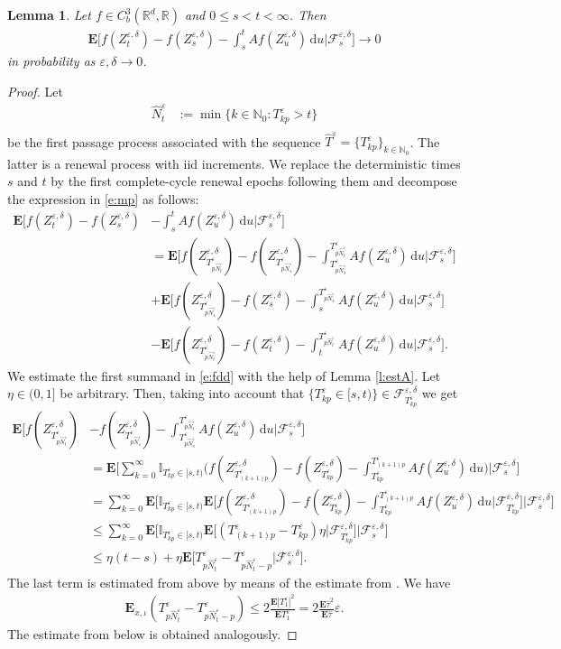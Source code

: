 \documentclass[10pt]{article}
\newcommand{\E}{\mathbf{E}}
\newcommand{\1}{1\!\!\!\;{\rm I}}
\theoremstyle{plain}
\newtheorem{lem}[thm]{Lemma}
\theoremstyle{definition}
\newcommand{\e}{\varepsilon}
\newcommand{\ba}{\begin{equation}\begin{aligned}}
\newcommand{\ea}{\end{aligned}\end{equation}}
\newcommand{\di}{\mathrm{d}}
\newcommand{\rF}{\mathscr{F}}
\newcommand{\bI}{\mathbb{I}}
\newcommand{\bR}{\mathbb{R}}
\numberwithin{equation}{section}
\begin{document}
\begin{lem}
\label{l:mp}
Let $f\in C^3_b(\bR^d,\bR)$ and $0\leq s<t<\infty$. Then
\ba
\label{e:mp}
\E\Big[ f(Z^{\e,\delta}_{t}) - f( Z^{\e,\delta}_s  ) - \int_s^t Af(Z^{\e,\delta}_u)\,\di u\Big|\rF^{\e,\delta}_s\Big]
\to 0
\ea
in probability as $\e,\delta\to 0$.
\end{lem}
\begin{proof}
Let
\ba
\widehat N^\e_t&:=\min\{k\in\mathbb N_0 \colon T^\e_{kp}> t\}\\
\ea
be the first passage process associated with the sequence $\widehat T^\e=\{T^\e_{kp}\}_{k\in\mathbb N_0}$.
The latter is a renewal process with iid increments. We replace the deterministic times $s$ and $t$
by the first complete-cycle renewal epochs following them and decompose the expression in
\eqref{e:mp}
as follows:
\ba
\label{e:fdd}
\E\Big[f(Z^{\e,\delta}_t) - f(Z^{\e,\delta}_s) & - \int_s^t Af(Z^{\e,\delta}_u)\,\di u\Big|\rF_s^{\e,\delta}\Big]\\
&=\E\Big[f(Z^{\e,\delta}_{T^\e_{p \widehat N^\e_t}}) - f(Z^{\e,\delta}_{T^\e_{p \widehat N^\e_s}})
- \int^{T^\e_{p \widehat N^\e_t}}_{T^\e_{p \widehat N^\e_s}}  Af(Z^{\e,\delta}_u)\,\di u\Big|\rF_s^{\e,\delta}\Big]\\
&+ \E\Big[f(Z^{\e,\delta}_{T^\e_{p \widehat N^\e_s}}) - f(Z^{\e,\delta}_{s})
- \int_{s}^{T^\e_{p \widehat N^\e_s}} Af(Z^{\e,\delta}_u)\,\di u\Big|\rF_s^{\e,\delta}\Big]\\
&-\E\Big[ f(Z^{\e,\delta}_{T^\e_{p \widehat N^\e_t}}) - f(Z^{\e,\delta}_t)
-\int_{t}^{T^\e_{p \widehat N^\e_t}} Af(Z^{\e,\delta}_u)\,\di u\Big|\rF_s^{\e,\delta}\Big].
\ea
We estimate the first summand in \eqref{e:fdd} with the help of Lemma \ref{l:estA}. Let $\eta\in(0,1]$ be arbitrary. Then,
taking into account that $\{T^\e_{kp}\in[s,t)\} \in \rF^{\e,\delta}_{T^\e_{kp}}$ we get
\ba
\E\Big[f(Z^{\e,\delta}_{T^\e_{p \widehat N^\e_t}}) & - f(Z^{\e,\delta}_{T^\e_{p \widehat N^\e_s}})
- \int^{T^\e_{p \widehat N^\e_t}}_{T^\e_{p \widehat N^\e_s}}  Af(Z^{\e,\delta}_u)\,\di u\Big|\rF_s^{\e,\delta}\Big]\\
&=\E\Big[\sum_{k=0}^\infty\bI_{T^\e_{kp}\in[s,t)} \Big(f(Z^{\e,\delta}_{T^\e_{(k+1)p}})
- f(Z^{\e,\delta}_{T^\e_{kp}})
- \int^{T^\e_{(k+1)p}}_{T^\e_{kp}} Af(Z^{\e,\delta}_u)\,\di u\Big)\Big|\rF_s^{\e,\delta}\Big]\\
&=\sum_{k=0}^\infty\E \Big[\bI_{T^\e_{kp}\in[s,t)} \E\Big[f(Z^{\e,\delta}_{T^\e_{(k+1)p}}) - f(Z^{\e,\delta}_{T^\e_{kp}})
- \int_{T^\e_{kp}}^{T^\e_{(k+1)p}} Af(Z^{\e,\delta}_u)\,\di u\Big|\rF^{\e,\delta}_{T^\e_{kp}} \Big]  \Big|\rF_s^{\e,\delta}\Big]\\
&\leq\sum_{k=0}^\infty
\E \Big[\bI_{T^\e_{kp}\in[s,t)}
\E\Big[ (T^\e_{(k+1)p}-T^\e_{kp})\eta \Big|\rF^{\e,\delta}_{T^\e_{kp}} \Big]  \Big|\rF_s^{\e,\delta}\Big]\\
&\leq \eta (t-s)
+ \eta \E\Big[T^\e_{p \widehat N^\e_t}-T^\e_{p \widehat N^\e_t-p} \Big|\rF_s^{\e,\delta}\Big].
\ea
The last term is estimated from above by means of
the estimate from \cite[Section 2]{lorden1970excess}. We have
\ba
\E_{x,\iota} (T^\e_{p \widehat N^\e_t}-T^\e_{p \widehat N^\e_t-p})\leq 2\frac{\E |T^\e_1|^2}{\E T^\e_1}
=2\frac{\E\widehat \tau^2}{\E \widehat \tau}\e.
\ea
The estimate from below is obtained analogously.



\end{proof}
\end{document}
